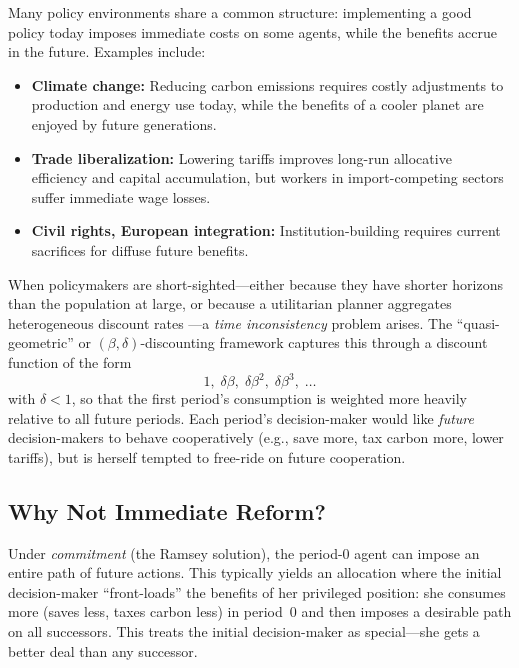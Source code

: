 \documentclass[12pt]{article}
\begin{document}
Many policy environments share a common structure: implementing a good policy
today imposes immediate costs on some agents, while the benefits accrue in the
future.  Examples include:
\begin{itemize}
  \item \textbf{Climate change:} Reducing carbon emissions requires costly adjustments
    to production and energy use today, while the benefits of a cooler planet are
    enjoyed by future generations.
  \item \textbf{Trade liberalization:} Lowering tariffs improves long-run allocative
    efficiency and capital accumulation, but workers in import-competing sectors suffer
    immediate wage losses.
  \item \textbf{Civil rights, European integration:} Institution-building requires
    current sacrifices for diffuse future benefits.
\end{itemize}

When policymakers are short-sighted---either because they have shorter horizons
than the population at large, or because a utilitarian planner aggregates
heterogeneous discount rates \citep{jackson2014present,jackson2015collective}---a
\emph{time inconsistency} problem arises.  The ``quasi-geometric'' or
$(\beta,\delta)$-discounting framework \citep{strotz1956myopia, phelpspollak1968,
laibson1997golden} captures this through a discount function of the form
\[
  1,\; \delta\beta,\; \delta\beta^2,\; \delta\beta^3,\;\ldots
\]
with $\delta < 1$, so that the first period's consumption is weighted more heavily
relative to all future periods.  Each period's decision-maker would like
\emph{future} decision-makers to behave cooperatively (e.g., save more, tax carbon
more, lower tariffs), but is herself tempted to free-ride on future cooperation.

\subsection{Why Not Immediate Reform?}

Under \emph{commitment} (the Ramsey solution), the period-0 agent can impose an
entire path of future actions.  This typically yields an allocation where the
initial decision-maker ``front-loads'' the benefits of her privileged position:
she consumes more (saves less, taxes carbon less) in period~0 and then imposes a
desirable path on all successors.  This treats the initial decision-maker as
special---she gets a better deal than any successor.
\end{document}
